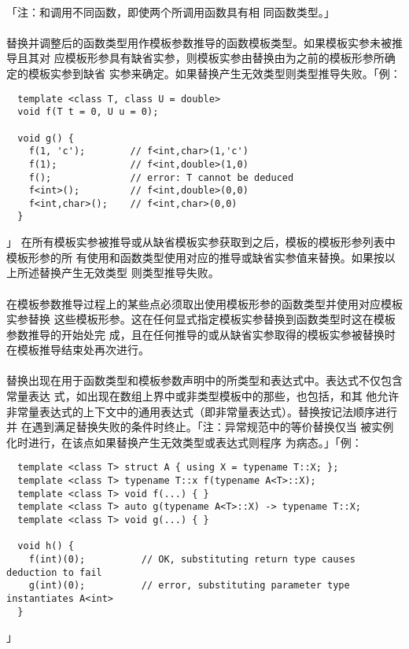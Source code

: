 \paragraph{}
「注：和调用不同函数，即使两个所调用函数具有相
同函数类型。」

\paragraph{}
替换并调整后的函数类型用作模板参数推导的函数模板类型。如果模板实参未被推导且其对
应模板形参具有缺省实参，则模板实参由替换由为之前的模板形参所确定的模板实参到缺省
实参来确定。如果替换产生无效类型则类型推导失败。「例：
\begin{lstlisting}
  template <class T, class U = double>
  void f(T t = 0, U u = 0);

  void g() {
    f(1, 'c');        // f<int,char>(1,'c')
    f(1);             // f<int,double>(1,0)
    f();              // error: T cannot be deduced
    f<int>();         // f<int,double>(0,0)
    f<int,char>();    // f<int,char>(0,0)
  }
\end{lstlisting}」
在所有模板实参被推导或从缺省模板实参获取到之后，模板的模板形参列表中模板形参的所
有使用和函数类型使用对应的推导或缺省实参值来替换。如果按以上所述替换产生无效类型
则类型推导失败。

\paragraph{}
在模板参数推导过程上的某些点必须取出使用模板形参的函数类型并使用对应模板实参替换
这些模板形参。这在任何显式指定模板实参替换到函数类型时这在模板参数推导的开始处完
成，且在任何推导的或从缺省实参取得的模板实参被替换时在模板推导结束处再次进行。

\paragraph{}
替换出现在用于函数类型和模板参数声明中的所类型和表达式中。表达式不仅包含常量表达
式，如出现在数组上界中或非类型模板中的那些，也包括，和其
他允许非常量表达式的上下文中的通用表达式（即非常量表达式）。替换按记法顺序进行并
在遇到满足替换失败的条件时终止。「注：异常规范中的等价替换仅当
被实例化时进行，在该点如果替换产生无效类型或表达式则程序
为病态。」「例：
\begin{lstlisting}
  template <class T> struct A { using X = typename T::X; };
  template <class T> typename T::x f(typename A<T>::X);
  template <class T> void f(...) { }
  template <class T> auto g(typename A<T>::X) -> typename T::X;
  template <class T> void g(...) { }

  void h() {
    f(int)(0);          // OK, substituting return type causes deduction to fail
    g(int)(0);          // error, substituting parameter type instantiates A<int>
  }
\end{lstlisting}」

